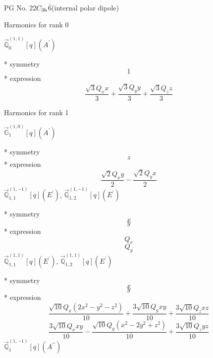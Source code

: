 \documentclass[fleqn,8pt]{jsarticle}
\begin{document}
\setcounter{MaxMatrixCols}{32}

\renewcommand{\tablename}{Table~}
\renewcommand{\figurename}{Figure~}
\begin{center}
\LARGE
PG No. 22\quad$C_{\rm 3h}$\quad$\bar{6}$\quad[ hexagonal ] (internal polar dipole)
\end{center}

\noindent * Harmonics for rank 0

\noindent\quad $\vec{\mathbb{Q}}_{0}^{(1,1)}[q](A^{\prime})$

\noindent\quad ** symmetry
\begin{dmath*}
1
\end{dmath*}
\noindent\quad ** expression
\begin{dmath*}
\frac{\sqrt{3} Q_{x} x}{3} + \frac{\sqrt{3} Q_{y} y}{3} + \frac{\sqrt{3} Q_{z} z}{3}
\end{dmath*}

\noindent * Harmonics for rank 1

\noindent\quad $\vec{\mathbb{G}}_{1}^{(1,0)}[q](A^{\prime})$

\noindent\quad ** symmetry
\begin{dmath*}
z
\end{dmath*}
\noindent\quad ** expression
\begin{dmath*}
\frac{\sqrt{2} Q_{x} y}{2} - \frac{\sqrt{2} Q_{y} x}{2}
\end{dmath*}
\noindent\quad $\vec{\mathbb{Q}}_{1,1}^{(1,-1)}[q](E^{\prime})$, $\vec{\mathbb{Q}}_{1,2}^{(1,-1)}[q](E^{\prime})$

\noindent\quad ** symmetry
\begin{dmath*}
x
\end{dmath*}
\begin{dmath*}
y
\end{dmath*}
\noindent\quad ** expression
\begin{dmath*}
Q_{x}
\end{dmath*}
\begin{dmath*}
Q_{y}
\end{dmath*}
\noindent\quad $\vec{\mathbb{Q}}_{1,1}^{(1,1)}[q](E^{\prime})$, $\vec{\mathbb{Q}}_{1,2}^{(1,1)}[q](E^{\prime})$

\noindent\quad ** symmetry
\begin{dmath*}
x
\end{dmath*}
\begin{dmath*}
y
\end{dmath*}
\noindent\quad ** expression
\begin{dmath*}
\frac{\sqrt{10} Q_{x} \left(2 x^{2} - y^{2} - z^{2}\right)}{10} + \frac{3 \sqrt{10} Q_{y} x y}{10} + \frac{3 \sqrt{10} Q_{z} x z}{10}
\end{dmath*}
\begin{dmath*}
\frac{3 \sqrt{10} Q_{x} x y}{10} - \frac{\sqrt{10} Q_{y} \left(x^{2} - 2 y^{2} + z^{2}\right)}{10} + \frac{3 \sqrt{10} Q_{z} y z}{10}
\end{dmath*}
\noindent\quad $\vec{\mathbb{Q}}_{1}^{(1,-1)}[q](A^{\prime\prime})$
\end{document}
